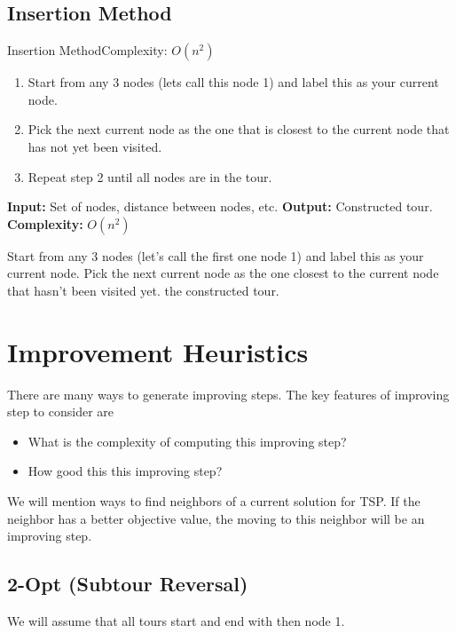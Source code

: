 \subsection{Insertion Method }
\begin{general}{Insertion Method}{Complexity: $O(n^2)$}
\label{heuristic:insertion}
\begin{enumerate}
\item Start from any 3 nodes (lets call this node 1) and label this as your current node.
\item Pick the next current node as the one that is closest to the current node that has not yet been visited.
\item Repeat step 2 until all nodes are in the tour.
\end{enumerate}
\end{general}
\begin{algorithm}
\caption{Insertion Method}
\label{heuristic:insertion}
\begin{algorithmic}[1]
    \State \textbf{Input:} Set of nodes, distance between nodes, etc.
    \State \textbf{Output:} Constructed tour.
    \State \textbf{Complexity:} $O(n^2)$

    \State Start from any 3 nodes (let's call the first one node 1) and label this as your current node.
        \State Pick the next current node as the one closest to the current node that hasn't been visited yet.
    \EndWhile
    \State \Return the constructed tour.
\end{algorithmic}
\end{algorithm}

\section{Improvement Heuristics}
There are many ways to generate improving steps.  The key features of improving step to consider are
\begin{itemize}
\item What is the complexity of  computing this improving step?
\item How good this this improving step?
\end{itemize}

We will mention ways to find neighbors of a current solution for TSP.  If the neighbor has a better objective value, the moving to this neighbor will be an improving step. 

\subsection{2-Opt (Subtour Reversal)}
We will assume that all tours start and end with then node 1.  

